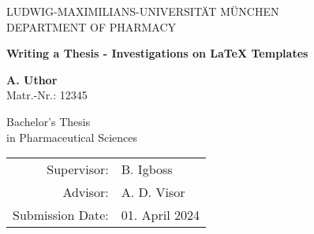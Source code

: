 \begin{titlepage}
	\begin{center}
		\uppercase{
			Ludwig-Maximilians-Universität München\\
			\vspace{1mm}
			Department of Pharmacy}
		\vspace{18mm}
		
		
		\vspace{18mm}
		
		\begin{LARGE}
			\textbf{Writing a Thesis - Investigations on LaTeX Templates}
		\end{LARGE}
		\vspace{10mm}
		
		\textbf{A. Uthor}\\
		Matr.-Nr.: 12345
		\vspace{10mm}
		
		Bachelor's Thesis\\
		in Pharmaceutical Sciences
		\vfill
		
		\begin{tabular}{ r l }
			Supervisor:  & B. Igboss \\
			Advisor:  & A. D. Visor \\
			Submission Date: & 01. April 2024 \\
		\end{tabular}
	\end{center}
\end{titlepage}